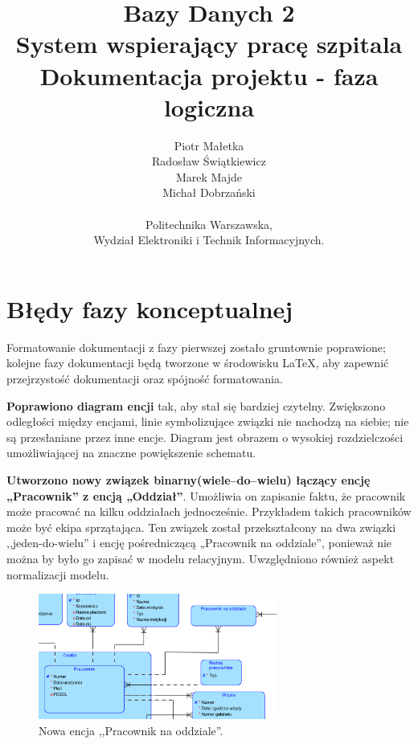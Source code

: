 

\title{Bazy Danych 2 \\ \Huge{System wspierający pracę szpitala} \\ \Large{Dokumentacja projektu - faza logiczna} }
\author{ Piotr Małetka \\ Radosław Świątkiewicz \\ Marek Majde \\ Michał Dobrzański \\ \\ Politechnika Warszawska, \\ Wydział Elektroniki i Technik Informacyjnych.}


\maketitle

\newpage

\section{Błędy fazy konceptualnej}
Formatowanie dokumentacji z fazy pierwszej zostało gruntownie poprawione;
kolejne fazy dokumentacji będą tworzone w środowisku \LaTeX , aby zapewnić przejrzystość dokumentacji oraz spójność formatowania.

\textbf{Poprawiono diagram encji} tak, aby stał się bardziej czytelny.
Zwiększono odległości między encjami, linie symbolizujące związki nie nachodzą na siebie; nie są przesłaniane przez inne encje.
Diagram jest obrazem o wysokiej rozdzielczości umożliwiającej na znaczne powiększenie schematu.


\textbf{Utworzono nowy związek binarny(wiele–do–wielu) łączący encję „Pracownik'' z encją „Oddział''}. Umożliwia on zapisanie faktu, że pracownik może pracować na kilku oddziałach jednocześnie. Przykładem takich pracowników może być ekipa sprzątająca. Ten związek został przekształcony na dwa związki ,,jeden-do-wielu'' i encję pośredniczącą „Pracownik na oddziale'', ponieważ nie można by było go zapisać w modelu relacyjnym. Uwzględniono również aspekt normalizacji modelu.

\begin{figure}[H]
\centering
\includegraphics[width=0.7\textwidth]{img/p_n_o.png}
\caption{\small Nowa encja ,,Pracownik na oddziale''.}
\label{fig:pno}
\end{figure}

